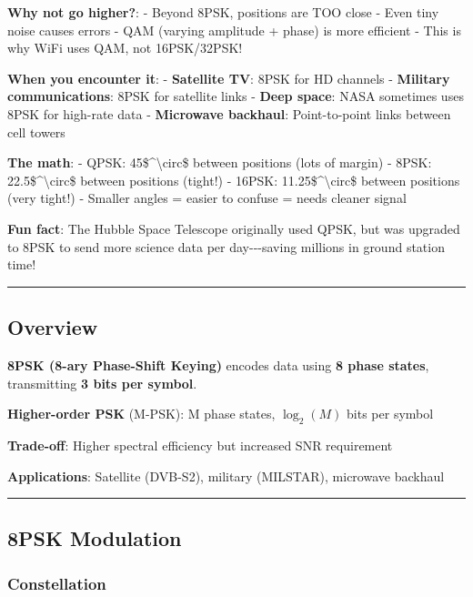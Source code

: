 \textbf{Why not go higher?}: - Beyond 8PSK, positions are TOO close -
Even tiny noise causes errors - QAM (varying amplitude + phase) is more
efficient - This is why WiFi uses QAM, not 16PSK/32PSK!

\textbf{When you encounter it}: - \textbf{Satellite TV}: 8PSK for HD
channels - \textbf{Military communications}: 8PSK for satellite links -
\textbf{Deep space}: NASA sometimes uses 8PSK for high-rate data -
\textbf{Microwave backhaul}: Point-to-point links between cell towers

\textbf{The math}: - QPSK: 45\$\^{}\textbackslash circ\$ between
positions (lots of margin) - 8PSK: 22.5\$\^{}\textbackslash circ\$
between positions (tight!) - 16PSK: 11.25\$\^{}\textbackslash circ\$
between positions (very tight!) - Smaller angles = easier to confuse =
needs cleaner signal

\textbf{Fun fact}: The Hubble Space Telescope originally used QPSK, but
was upgraded to 8PSK to send more science data per day-\/-\/-saving
millions in ground station time!

\begin{center}\rule{0.5\linewidth}{0.5pt}\end{center}

\subsection{Overview}\label{overview}

\textbf{8PSK (8-ary Phase-Shift Keying)} encodes data using \textbf{8
phase states}, transmitting \textbf{3 bits per symbol}.

\textbf{Higher-order PSK} (M-PSK): M phase states, \(\log_2(M)\) bits
per symbol

\textbf{Trade-off}: Higher spectral efficiency but increased SNR
requirement

\textbf{Applications}: Satellite (DVB-S2), military (MILSTAR), microwave
backhaul

\begin{center}\rule{0.5\linewidth}{0.5pt}\end{center}

\subsection{8PSK Modulation}\label{psk-modulation}

\subsubsection{Constellation}\label{constellation}

